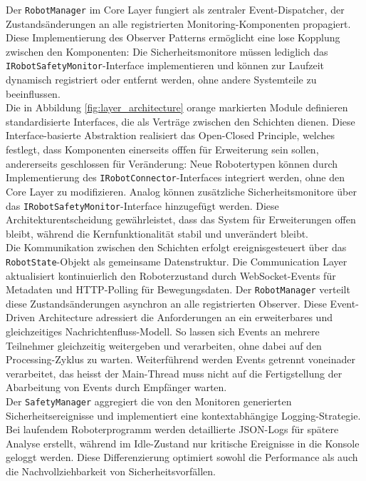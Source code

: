 \noindent Der \texttt{RobotManager} im Core Layer fungiert als zentraler
Event-Dispatcher, der Zustandsänderungen an alle registrierten
Monitoring-Komponenten propagiert. Diese Implementierung des Observer Patterns
ermöglicht eine lose Kopplung zwischen den
Komponenten: Die Sicherheitsmonitore müssen
lediglich das \texttt{IRobotSafetyMonitor}-Interface implementieren und können
zur Laufzeit dynamisch registriert oder entfernt werden, ohne andere Systemteile
zu beeinflussen.\\

\noindent
Die in Abbildung \ref{fig:layer_architecture} orange markierten Module
definieren standardisierte Interfaces, die als Verträge zwischen den Schichten
dienen. Diese Interface-basierte Abstraktion realisiert das Open-Closed
Principle, welches festlegt, dass Komponenten einerseits offfen für Erweiterung
sein sollen, andererseits geschlossen für Veränderung: Neue Robotertypen können durch Implementierung
des \texttt{IRobotConnector}-Interfaces integriert werden, ohne den Core Layer
zu modifizieren. Analog können zusätzliche Sicherheitsmonitore über das
\texttt{IRobotSafetyMonitor}-Interface hinzugefügt werden. Diese
Architekturentscheidung gewährleistet, dass das System für Erweiterungen offen
bleibt, während die Kernfunktionalität stabil und unverändert bleibt.\\

\noindent
Die Kommunikation zwischen den Schichten erfolgt ereignisgesteuert über das
\texttt{RobotState}-Objekt als gemeinsame Datenstruktur. Die Communication Layer
aktualisiert kontinuierlich den Roboterzustand durch WebSocket-Events für
Metadaten und HTTP-Polling für Bewegungsdaten. Der \texttt{RobotManager}
verteilt diese Zustandsänderungen asynchron an alle registrierten Observer.
Diese Event-Driven Architecture adressiert die Anforderungen an ein
erweiterbares und gleichzeitiges Nachrichtenfluss-Modell. So lassen sich Events
an mehrere Teilnehmer gleichzeitig weitergeben und verarbeiten, ohne dabei auf
den Processing-Zyklus zu warten. Weiterführend werden Events getrennt voneinader
verarbeitet, das heisst der Main-Thread muss nicht auf die Fertigstellung der
Abarbeitung von Events durch Empfänger warten.\\

\noindent
Der \texttt{SafetyManager} aggregiert die von den Monitoren generierten
Sicherheitsereignisse und implementiert eine kontextabhängige Logging-Strategie.
Bei laufendem Roboterprogramm werden detaillierte JSON-Logs für spätere Analyse
erstellt, während im Idle-Zustand nur kritische Ereignisse in die Konsole
geloggt werden. Diese Differenzierung optimiert sowohl die Performance als auch
die Nachvollziehbarkeit von Sicherheitsvorfällen.\\

